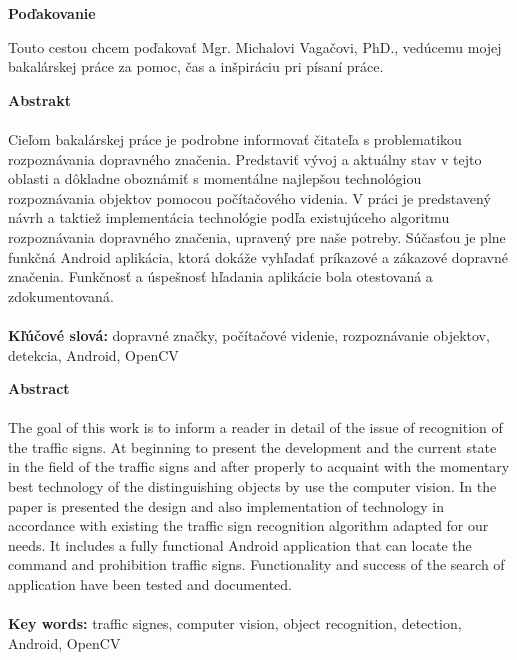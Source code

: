 \documentclass[12pt]{article}
\begin{document}
\textbf{Poďakovanie}

Touto cestou chcem poďakovať Mgr. Michalovi Vagačovi, PhD., vedúcemu mojej bakalárskej práce za pomoc, čas a inšpiráciu pri písaní práce.

\thispagestyle{empty}
\clearpage
\centerline{\textbf{Abstrakt}}
\paragraph{}
Cieľom bakalárskej práce je podrobne informovať čitateľa s problematikou rozpoznávania dopravného značenia.
Predstaviť vývoj a aktuálny stav v tejto oblasti a dôkladne oboznámiť s momentálne najlepšou technológiou rozpoznávania objektov pomocou počítačového videnia.
V práci je predstavený návrh a taktiež implementácia technológie podľa existujúceho algoritmu rozpoznávania dopravného značenia, upravený pre naše potreby.
Súčasťou je plne funkčná Android aplikácia, ktorá dokáže vyhľadať príkazové a zákazové dopravné značenia. Funkčnosť a úspešnosť hľadania aplikácie bola otestovaná a zdokumentovaná.
\\\\
\textbf{Kľúčové slová:} dopravné značky, počítačové videnie, rozpoznávanie objektov, detekcia, Android, OpenCV
\thispagestyle{empty}
\clearpage

\centerline{\textbf{Abstract}}
\paragraph{}
The goal of this work is to inform a reader in detail of the issue of recognition of the traffic signs. At beginning to present the development and the current state in the field of the traffic signs and after properly to acquaint with the momentary best technology of the distinguishing objects by use the computer vision. In the paper is presented the design and also implementation of technology in accordance with existing the traffic sign recognition algorithm adapted for our needs. It includes a fully functional Android application that can locate the command and prohibition traffic signs. Functionality and success of the search of application have been tested and documented.
\\\\
\textbf{Key words:} traffic signes, computer vision, object recognition, detection, Android, OpenCV
\thispagestyle{empty}
\clearpage
\tableofcontents
{}
\thispagestyle{empty}
\clearpage
\listoftables
\thispagestyle{empty}
\clearpage
\listoffigures
\thispagestyle{empty}
\clearpage
\lstlistoflistings
\thispagestyle{empty}
\clearpage
\end{document}
